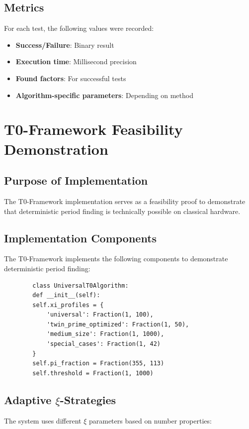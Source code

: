 	\subsection{Metrics}
	
	For each test, the following values were recorded:
	\begin{itemize}
		\item \textbf{Success/Failure}: Binary result
		\item \textbf{Execution time}: Millisecond precision
		\item \textbf{Found factors}: For successful tests
		\item \textbf{Algorithm-specific parameters}: Depending on method
	\end{itemize}
	
	\section{T0-Framework Feasibility Demonstration}
	
	\subsection{Purpose of Implementation}
	
	The T0-Framework implementation serves as a feasibility proof to demonstrate that deterministic period finding is technically possible on classical hardware.
	
	\subsection{Implementation Components}
	
	The T0-Framework implements the following components to demonstrate deterministic period finding:
	
	\begin{verbatim}
		class UniversalT0Algorithm:
		def __init__(self):
		self.xi_profiles = {
			'universal': Fraction(1, 100),
			'twin_prime_optimized': Fraction(1, 50),
			'medium_size': Fraction(1, 1000),
			'special_cases': Fraction(1, 42)
		}
		self.pi_fraction = Fraction(355, 113)
		self.threshold = Fraction(1, 1000)
	\end{verbatim}
	
	\subsection{Adaptive $\xi$-Strategies}
	
	The system uses different $\xi$ parameters based on number properties:
	
